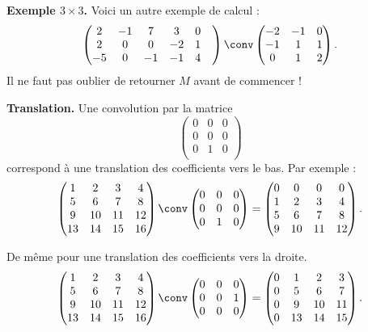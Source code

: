 \documentclass[11pt,class=report,crop=false]{standalone}
\begin{document}
\textbf{Exemple $3\times3$.} Voici un autre exemple de calcul :
$$\begin{pmatrix}
2& -1 & 7 & 3 & 0 & \\
2 & 0 & 0 & -2 & 1 & \\
-5 & 0 & -1 & -1 & 4 & \\
\end{pmatrix}
\conv
\begin{pmatrix}
-2 & -1 & 0 \\
-1 & 1 & 1 \\
 0 & 1 & 2 \\
\end{pmatrix}.
$$
Il ne faut pas oublier de retourner $M$ avant de commencer !


  \textbf{Translation.}
Une convolution par la matrice 
$$\begin{pmatrix}
0 & 0 & 0 \\
0 & 0 & 0 \\
0 & 1 & 0 \\
\end{pmatrix}$$ correspond à une translation des coefficients vers le bas.
Par exemple :
$$\begin{pmatrix}
1&2&3&4\\
5&6&7&8\\
9&10&11&12\\
13&14&15&16
\end{pmatrix}
\conv
\begin{pmatrix}
0 & 0 & 0 \\
0 & 0 & 0 \\
0 & 1 & 0 \\
\end{pmatrix}
= 
\begin{pmatrix}
0&0&0&0\\
1&2&3&4\\
5&6&7&8\\
9&10&11&12\\
\end{pmatrix}.$$

De même pour une translation des coefficients vers la droite.
$$\begin{pmatrix}
1&2&3&4\\
5&6&7&8\\
9&10&11&12\\
13&14&15&16\\
\end{pmatrix}
\conv
\begin{pmatrix}
0 & 0 & 0 \\
0 & 0 & 1 \\
0 & 0 & 0 \\
\end{pmatrix}
= 
\begin{pmatrix}
0&1&2&3\\
0&5&6&7\\
0&9&10&11\\
0&13&14&15\\
\end{pmatrix}.$$
\end{document}
